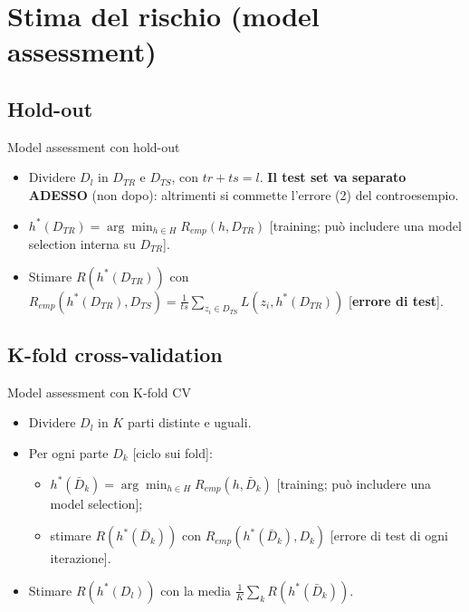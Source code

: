 \section{Stima del rischio (model
assessment)}\label{stima-del-rischio-model-assessment}

\subsection{Hold-out}\label{hold-out-1}

\begin{boxabstract}{Model assessment con hold-out}

\begin{itemize}
\tightlist
\item
  Dividere \(D_l\) in \(D_{TR}\) e \(D_{TS}\), con \(tr + ts = l\).
  \textbf{Il test set va separato ADESSO} (non dopo): altrimenti si
  commette l'errore (2) del controesempio.
\item
  \(h^*(D_{TR}) = \arg\min_{h \in H} R_{emp}(h, D_{TR})\) {[}training;
  può includere una model selection interna su \(D_{TR}\){]}.
\item
  Stimare \(R(h^*(D_{TR}))\) con
  \(R_{emp}(h^*(D_{TR}), D_{TS}) = \frac{1}{ts}\sum_{z_i \in D_{TS}} L(z_i, h^*(D_{TR}))\)
  {[}\textbf{errore di test}{]}.
\end{itemize}

\end{boxabstract}

\subsection{K-fold cross-validation}\label{k-fold-cross-validation-1}

\begin{boxabstract}{Model assessment con K-fold CV}

\begin{itemize}
\tightlist
\item
  Dividere \(D_l\) in \(K\) parti distinte e uguali.
\item
  Per ogni parte \(D_k\) {[}ciclo sui fold{]}:

  \begin{itemize}
  \tightlist
  \item
    \(h^*(\bar D_k) = \arg\min_{h \in H} R_{emp}(h, \bar D_k)\)
    {[}training; può includere una model selection{]};
  \item
    stimare \(R(h^*(\bar D_k))\) con \(R_{emp}(h^*(\bar D_k), D_k)\)
    {[}errore di test di ogni iterazione{]}.
  \end{itemize}
\item
  Stimare \(R(h^*(D_l))\) con la media
  \(\frac{1}{K}\sum_k R(h^*(\bar D_k))\).
\end{itemize}

\end{boxabstract}

